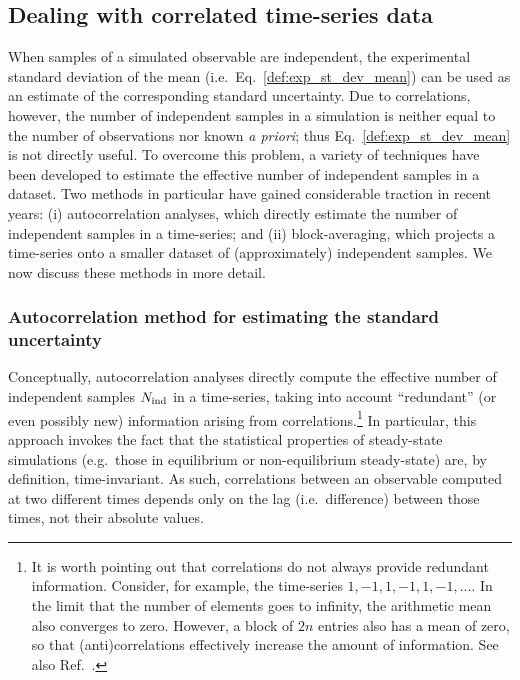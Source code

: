 \subsection{Dealing with correlated time-series data}

When samples of a simulated observable are independent, the experimental standard deviation of the mean (i.e.\  Eq.~\hyperref[def:exp_st_dev]{\ref{def:exp_st_dev_mean}}) can be used as an estimate of the corresponding standard uncertainty.  Due to correlations, however, the number of independent samples in a simulation is neither equal to the number of observations nor known {\it a priori}; thus Eq.~\ref{def:exp_st_dev_mean} is not directly useful.  To overcome this problem, a variety of techniques have been developed to estimate the effective number of independent samples in a dataset.  Two methods in particular have gained considerable traction in recent years:  (i) autocorrelation analyses, which directly estimate the number of independent samples in a time-series; and (ii) block-averaging, which projects a time-series onto a smaller dataset of (approximately) independent samples.  We now discuss these methods in more detail.


\subsubsection{Autocorrelation method for estimating the standard uncertainty}\label{sec:autocorrelation}

Conceptually, autocorrelation analyses directly compute the effective number of independent samples $N_{\rm ind}$ in a time-series, taking into account ``redundant'' (or even possibly new) information arising from correlations.\footnote{It is worth pointing out that correlations do not always provide redundant information.  Consider, for example, the time-series $1,-1,1,-1,1,-1,...$.  In the limit that the number of elements goes to infinity, the arithmetic mean also converges to zero.  However, a block of $2n$ entries also has a mean of zero, so that (anti)correlations effectively increase the amount of information.  See also Ref.~\cite{PatroneAIAA}. }  In particular, this approach invokes the fact that the statistical properties of steady-state simulations (e.g.\ those in equilibrium or non-equilibrium steady-state) are, by definition, time-invariant.  As such, correlations between an observable computed at two different times depends only on the lag (i.e.\ difference) between those times, not their absolute values.


